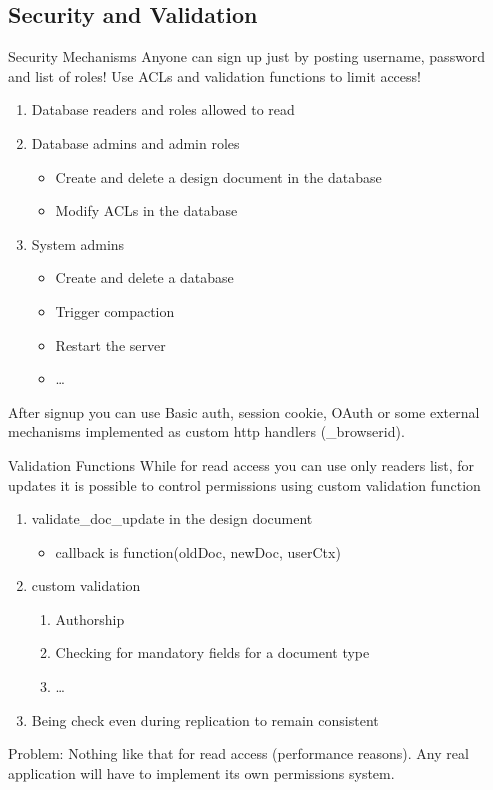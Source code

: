 \documentclass{beamer}
\begin{document}
\subsection{Security and Validation}
\begin{frame}{Security Mechanisms}
  Anyone can sign up just by posting username, password and list of roles!
  Use ACLs and validation functions to limit access!
  \begin{enumerate}
    \item Database readers and roles allowed to read
    \item Database admins and admin roles
    \begin{itemize}
      \item Create and delete a design document in the database
      \item Modify ACLs in the database
    \end{itemize}
    \item System admins
    \begin{itemize}
      \item Create and delete a database
      \item Trigger compaction
      \item Restart the server
      \item \ldots
    \end{itemize}
  \end{enumerate}
  After signup you can use Basic auth, session cookie, OAuth or some external
  mechanisms implemented as custom http handlers (\_browserid).
\end{frame}

\begin{frame}{Validation Functions}
  While for read access you can use only readers list, for updates
  it is possible to control permissions using custom validation function
  \begin{enumerate}
    \item validate\_doc\_update in the design document
    \begin{itemize}
      \item callback is function(oldDoc, newDoc, userCtx)
    \end{itemize}
    \item custom validation
    \begin{enumerate}
      \item Authorship
      \item Checking for mandatory fields for a document type
      \item \ldots
    \end{enumerate}
    \item Being check even during replication to remain consistent
  \end{enumerate}
  Problem: Nothing like that for read access (performance reasons).
  Any real application will have to implement its own permissions system.
\end{frame}
\end{document}

